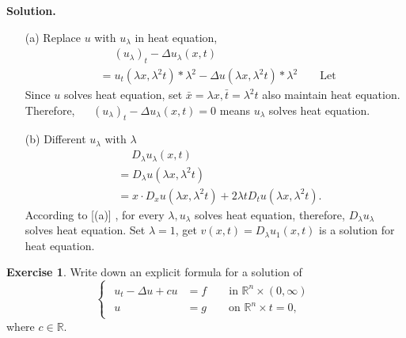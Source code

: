 \documentclass[a4paper]{book}
\newenvironment{solution}%
{\noindent\textbf{Solution.}}%
{\qedhere}
\numberwithin{equation}{chapter}
\theoremstyle{definition}
\newtheorem{exc}[exm]{Exercise}
\begin{document}
\begin{multicols}{2}
\begin{solution}
	\begin{itemize}
		\item [(a)] Replace $ u $ with $ u_\lambda $ in heat equation,
		\begin{equation}\label{3:3:1}
			\begin{aligned}
			&\quad\; (u_\lambda)_t - \Delta u_\lambda (x,t) \\
			&=u_t(\lambda x,\lambda^2 t) * \lambda^2 - \Delta u(\lambda x, \lambda^2 t) * \lambda^2 \qquad \text{Let } 
			\end{aligned}
		\end{equation}
		Since $ u $ solves heat equation, set $ \bar{x} = \lambda x, \bar{t} = \lambda^2 t $ also maintain heat equation. Therefore, $\quad\; (u_\lambda)_t - \Delta u_\lambda (x,t) = 0 $ means $u_\lambda $ solves heat equation.
		
		\item [(b)] Different $ u_\lambda  $ with $ \lambda $
		\begin{align*}
			&\quad\; D_\lambda u_\lambda(x,t) \\
			&=D_\lambda u(\lambda x, \lambda^2 t) \\
			&=x \cdot D_x u(\lambda x, \lambda^2 t) + 2\lambda t D_t u(\lambda x, \lambda^2 t). 
		\end{align*}
		According to [(a)] , for every $ \lambda , u_\lambda$ solves heat equation,
		therefore, $ D_\lambda u_\lambda $ solves heat equation. Set $ \lambda = 1 $, get $ v(x,t) = D_\lambda u_1(x,t) $ is a solution for heat equation. 
	\end{itemize} 
\end{solution}

\begin{exc}
	Write down an explicit formula for a solution of 
	\begin{equation}
	\begin{cases}
	\begin{aligned} 
			u_t - \Delta u + cu &= f \qquad \text{in } \mathbb{R}^n \times (0, \infty)\\
			u &= g \qquad \text{on } \mathbb{R}^n \times {t = 0},
			\end{aligned}
	\end{cases}
	\end{equation}
	where $ c \in \mathbb{R}. $
\end{exc}


\end{multicols}
\end{document}
